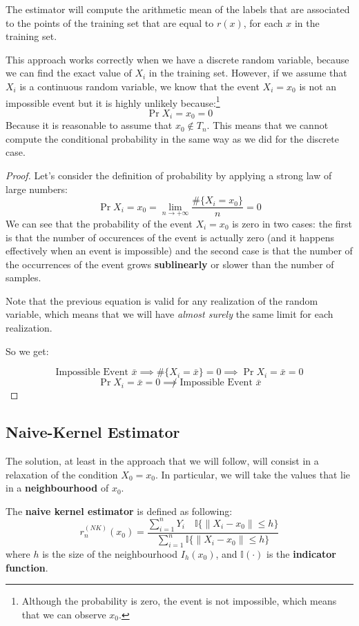 The estimator will compute the arithmetic mean of the labels that are associated to the points of the training set that are equal to $r(x)$, for each $x$ in the training set.

This approach works correctly when we have a discrete random variable, because we can find the exact value of $X_i$ in the training set. However, if we assume that $X_i$ is a continuous random variable, we know that the event $X_i = x_0$ is not an impossible event but it is highly unlikely because:\footnote{Although the probability is zero, the event is not impossible, which means that we can observe $x_0$.}
\[
    \Pr{X_i = x_0} = 0
\]
Because it is reasonable to assume that $x_0 \notin T_n$. This means that we cannot compute the conditional probability in the same way as we did for the discrete case.

\begin{proof}
    Let's consider the definition of probability by applying a strong law of large numbers:
    \[
        \Pr{X_i = x_0} = \lim_{n \to +\infty} \frac{\#\{X_i = x_0\}}{n} = 0
    \]
    We can see that the probability of the event $X_i = x_0$ is zero in two cases: the first is that the number of occurences of the event is actually zero (and it happens effectively when an event is impossible) and the second case is that the number of the occurrences of the event grows \textbf{sublinearly} or slower than the number of samples.

    Note that the previous equation is valid for any realization of the random variable, which means that we will have \textit{almost surely} the same limit for each realization.

    So we get:

    \[
        \text{Impossible Event } \bar x \implies \#\{X_i=\bar x\} = 0\implies \Pr{X_i = \bar x} = 0
    \]
    \[
        \Pr{X_i = \bar x} = 0 \not\implies \text{Impossible Event }\bar x
    \]
\end{proof}
\subsection{Naive-Kernel Estimator}
The solution, at least in the approach that we will follow, will consist in a relaxation of the condition $X_0 = x_0$. In particular, we will take the values that lie in a \textbf{neighbourhood} of $x_0$.
\begin{definition}
    The \textbf{naive kernel estimator} is defined as following:
    \[
        r_n^{(NK)}(x_0) = \frac{\sum_{i=1}^n Y_i \quad \mathbb{I}\{\lVert X_i - x_0 \rVert \leq h\} }{\sum_{i=1}^n \mathbb{I}\{\lVert X_i - x_0 \rVert \leq h\}}
    \]
    where $h$ is the size of the neighbourhood $I_h(x_0)$, and $\mathbb{I}(\cdot)$ is the \textbf{indicator function}.
\end{definition}

